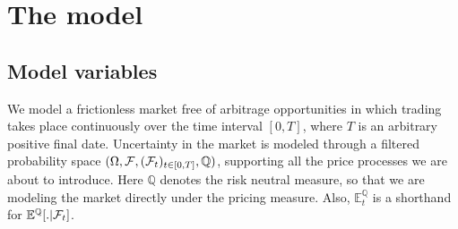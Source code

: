\documentclass[12pt,a4paper]{article}
\theoremstyle{plain}
\numberwithin{equation}{section}
\begin{document}
\section{The model}\label{modelsection}
\subsection{Model variables}
We model a frictionless market free of arbitrage opportunities in which trading takes place continuously over the time interval $[0,T]$, where $T$ is an arbitrary positive final date.
Uncertainty in the market is modeled through a filtered probability space $(\Omega, {\cal F}, ({\cal F}_t)_{t \in [0,T]}, \mathbb{Q})$, supporting all the price processes we are about to introduce. Here $\mathbb{Q}$ denotes the risk neutral measure, so that we are modeling the market directly under the pricing measure. Also, $\mathbb{E}^{\mathbb Q}_t$ is a shorthand for $\mathbb{E}^{\mathbb Q}[.\vert {\cal F}_t]$.
\end{document}
